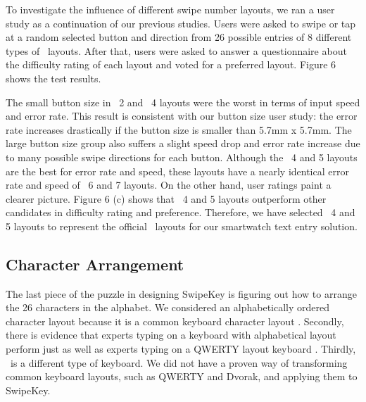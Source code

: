 To investigate the influence of different swipe number layouts, we ran a user study as a continuation of our previous studies. Users were asked to swipe or tap at a random selected button and direction from 26 possible entries of 8 different types of \papertitle\ layouts. After that, users were asked to answer a questionnaire about the difficulty rating of each layout and voted for a preferred layout. Figure 6 shows the test results.

The small button size in \papertitle\ 2 and \papertitle\ 4 layouts were the worst in terms of input speed and error rate. This result is consistent with our button size user study: the error rate increases drastically if the button size is smaller than 5.7mm x 5.7mm. The large button size group also suffers a slight speed drop and error rate increase due to many possible swipe directions for each button. Although the \papertitle\ 4 and 5 layouts are the best for error rate and speed, these layouts have a nearly identical error rate and speed of \papertitle\ 6 and 7 layouts. On the other hand, user ratings paint a clearer picture. Figure 6 (c) shows that \papertitle\ 4 and 5 layouts outperform other candidates in difficulty rating and preference. Therefore, we have selected \papertitle\ 4 and 5 layouts to represent the official \papertitle\ layouts for our smartwatch text entry solution.

\subsection{Character Arrangement}
The last piece of the puzzle in designing SwipeKey is figuring out how to arrange the 26 characters in the alphabet. We considered an alphabetically ordered character layout because it is a common keyboard character layout \cite{text-entry-theory}. Secondly, there is evidence that experts typing on a keyboard with alphabetical layout perform just as well as experts typing on a QWERTY layout keyboard \cite{text-entry-theory,abc-not-matter}. Thirdly, \papertitle\ is a different type of keyboard. We did not have a proven way of transforming common keyboard layouts, such as QWERTY and Dvorak, and applying them to SwipeKey.

